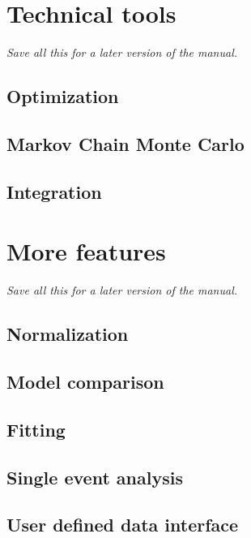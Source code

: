 \documentclass[11pt, a4paper]{article}
\begin{document}
\section{Technical tools}
\label{section:tools}

{\it Save all this for a later version of the manual.} 

\subsection{Optimization}

\subsection{Markov Chain Monte Carlo}

\subsection{Integration}

\section{More features}
\label{section:features}

{\it Save all this for a later version of the manual.} 

\subsection{Normalization}

\subsection{Model comparison}

\subsection{Fitting}

\subsection{Single event analysis}

\subsection{User defined data interface} 
\end{document}
